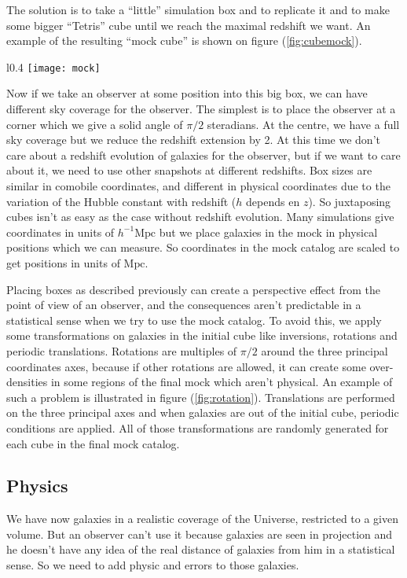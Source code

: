 The solution is to take a ``little'' simulation box and to replicate it and to
make some bigger ``Tetris'' cube until we reach the maximal redshift we want.
An example of the resulting ``mock cube'' is shown on figure
(\ref{fig:cubemock}).
%
\begin{wrapfigure}{l}{0.4\linewidth}
    \centering
    \texttt{[image: mock]}
    \caption{The structure of the mock catalog once we have replicated the
    simulation box chosen to populate dark matter halos.}%
\label{fig:cubemock}
\end{wrapfigure}

Now if we take an observer at some position into this big box, we can have
different sky coverage for the observer. The simplest is to place the observer
at a corner which we give a solid angle of $\pi/2$ steradians. At the centre,
we have a full sky coverage but we reduce the redshift extension by 2.
%
At this time we don't care about a redshift evolution of galaxies for the
observer, but if we want to care about it, we need to use other snapshots at
different redshifts. Box sizes are similar in comobile coordinates, and
different in physical coordinates due to the variation of the Hubble constant
with redshift ($h$ depends en $z$). So juxtaposing cubes isn't as easy as the
case without redshift evolution.
%
Many simulations give coordinates in units of $h^{-1}\mathrm{Mpc}$ but we place
galaxies in the mock in physical positions which we can measure. So coordinates
in the mock catalog are scaled to get positions in units of $\mathrm{Mpc}$.

Placing boxes as described previously can create a perspective effect from the
point of view of an observer, and the consequences aren't predictable in a
statistical sense when we try to use the mock catalog. To avoid this, we apply
some transformations on galaxies in the initial cube like inversions, rotations
and periodic translations. Rotations are multiples of $\pi/2$ around the three
principal coordinates axes, because if other rotations are allowed, it can
create some over-densities in some regions of the final mock which aren't
physical. An example of such a problem is illustrated in figure
(\ref{fig:rotation}). Translations are performed on the three principal axes
and when galaxies are out of the initial cube, periodic conditions are applied.
All of those transformations are randomly generated for each cube in the final
mock catalog.
%
\subsection{Physics}
%
We have now galaxies in a realistic coverage of the Universe, restricted to a
given volume. But an observer can't use it because galaxies are seen in
projection and he doesn't have any idea of the real distance of galaxies from
him in a statistical sense. So we need to add physic and errors to those
galaxies.
%

